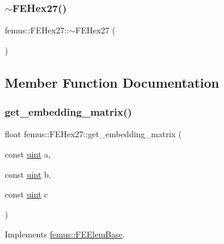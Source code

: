 \mbox{\label{classfemus_1_1_f_e_hex27_a4423c27701fafe1a1546c0dc66c94b48}} 
\subsubsection{\texorpdfstring{$\sim$\+F\+E\+Hex27()}{~FEHex27()}}
{\footnotesize\ttfamily femus\+::\+F\+E\+Hex27\+::$\sim$\+F\+E\+Hex27 (\begin{DoxyParamCaption}{ }\end{DoxyParamCaption})}



\subsection{Member Function Documentation}
\mbox{\label{classfemus_1_1_f_e_hex27_a0bfb79afd1a19396983b0ea03daf00ff}} 
\subsubsection{\texorpdfstring{get\+\_\+embedding\+\_\+matrix()}{get\_embedding\_matrix()}}
{\footnotesize\ttfamily float femus\+::\+F\+E\+Hex27\+::get\+\_\+embedding\+\_\+matrix (\begin{DoxyParamCaption}\item[{const \mbox{\hyperlink{_typedefs_8hpp_a91ad9478d81a7aaf2593e8d9c3d06a14}{uint}}}]{a,  }\item[{const \mbox{\hyperlink{_typedefs_8hpp_a91ad9478d81a7aaf2593e8d9c3d06a14}{uint}}}]{b,  }\item[{const \mbox{\hyperlink{_typedefs_8hpp_a91ad9478d81a7aaf2593e8d9c3d06a14}{uint}}}]{c }\end{DoxyParamCaption})\hspace{0.3cm}{\ttfamily [virtual]}}



Implements \mbox{\hyperlink{classfemus_1_1_f_e_elem_base_a0c4d6d5ec66bd4e301eb8ea2ef10f354}{femus\+::\+F\+E\+Elem\+Base}}.

